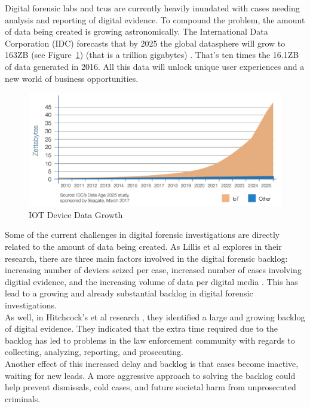 \documentclass[12pt]{article}
\begin{document}
Digital forensic labs and \glspl{tcu} are currently heavily inundated with cases needing
analysis and reporting of digital evidence.  To compound the problem, the amount of
data being created is growing astronomically.  The International Data Corporation
(IDC) forecasts that by 2025 the global datasphere will grow to 163ZB (see
Figure~\ref{fig:IOT}) (that is a trillion gigabytes) \cite{IDCDataAge2017}. That's ten times the 16.1ZB
of data generated in 2016. All this data will unlock unique user experiences and
a new world of business opportunities.\\

\begin{figure}[H]
  \centering
    \includegraphics[width=\textwidth]{images/IOT_chart.jpg}
  \caption{IOT Device Data Growth}
  \label{fig:IOT}
\end{figure}

Some of the current challenges in digital forensic investigations are directly
related to the amount of data being created.  As Lillis et al
explores in their research, there are three main factors involved in the digital
forensic backlog: increasing number of devices seized per case, increased number of
cases involving digitial evidence, and the increasing volume of data per digital
media \cite{lillis2016current}.  This has lead to a growing and already substantial
backlog in digital forensic investigations.\\

As well, in Hitchcock's et al research \cite{hitchcock2016tiered}, they identified
a large and growing backlog of digital evidence.  They indicated that the extra
time required due to the backlog has led to problems in the law enforcement
community with regards to collecting, analyzing, reporting, and prosecuting.\\

Another effect of this increased delay and backlog is that cases become inactive,
waiting for new leads.  A more aggressive approach to solving the backlog could
help prevent dismissals, cold cases, and future societal harm from unprosecuted 
criminals.\\
\end{document}
